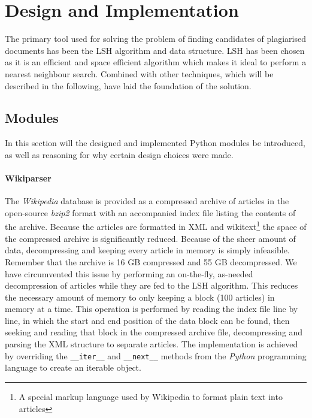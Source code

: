 \section{Design and Implementation}
The primary tool used for solving the problem of finding candidates of plagiarised documents has been the LSH algorithm and data structure. LSH has been chosen as it is an efficient and space efficient algorithm which makes it ideal to perform a nearest neighbour search. Combined with other techniques, which will be described in the following, have laid the foundation of the solution.

\subsection{Modules}
In this section will the designed and implemented Python modules be introduced, as well as reasoning for why certain design choices were made.

\paragraph{Wikiparser}
The \emph{Wikipedia} database is provided as a compressed archive of articles in the open-source \emph{bzip2} format with an accompanied index file listing the contents of the archive. Because the articles are formatted in XML and wikitext\footnote{A special markup language used by Wikipedia to format plain text into articles} the space of the compressed archive is significantly reduced. Because of the sheer amount of data, decompressing and keeping every article in memory is simply infeasible. Remember that the archive is 16 GB compressed and 55 GB decompressed. We have circumvented this issue by performing an on-the-fly, as-needed decompression of articles while they are fed to the LSH algorithm. This reduces the necessary amount of memory to only keeping a block (100 articles) in memory at a time. This operation is performed by reading the index file line by line, in which the start and end position of the data block can be found, then seeking and reading that block in the compressed archive file, decompressing and parsing the XML structure to separate articles. The implementation is achieved by overriding the \texttt{\_\_iter\_\_} and \texttt{\_\_next\_\_} methods from the \emph{Python} programming language to create an iterable object.

